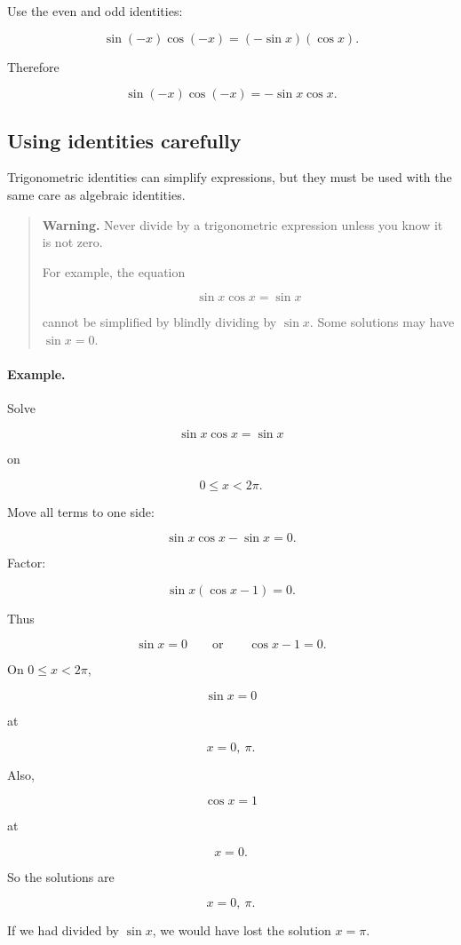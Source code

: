 Use the even and odd identities:

\[
\sin(-x)\cos(-x)
=
(-\sin x)(\cos x).
\]

Therefore

\[
\boxed{
\sin(-x)\cos(-x)=-\sin x\cos x.
}
\]

\subsection{Using identities carefully}
\label{appsubsec:using-identities-carefully}

Trigonometric identities can simplify expressions, but they must be used with the same
care as algebraic identities.

\begin{quote}
\textbf{Warning.}
Never divide by a trigonometric expression unless you know it is not zero.

For example, the equation

\[
\sin x\cos x=\sin x
\]

cannot be simplified by blindly dividing by \(\sin x\).  Some solutions may have
\(\sin x=0\).
\end{quote}

\paragraph{Example.}
Solve

\[
\sin x\cos x=\sin x
\]

on

\[
0\le x<2\pi.
\]

Move all terms to one side:

\[
\sin x\cos x-\sin x=0.
\]

Factor:

\[
\sin x(\cos x-1)=0.
\]

Thus

\[
\sin x=0
\qquad\text{or}\qquad
\cos x-1=0.
\]

On \(0\le x<2\pi\),

\[
\sin x=0
\]

at

\[
x=0,\ \pi.
\]

Also,

\[
\cos x=1
\]

at

\[
x=0.
\]

So the solutions are

\[
\boxed{
x=0,\ \pi.
}
\]

If we had divided by \(\sin x\), we would have lost the solution \(x=\pi\).

